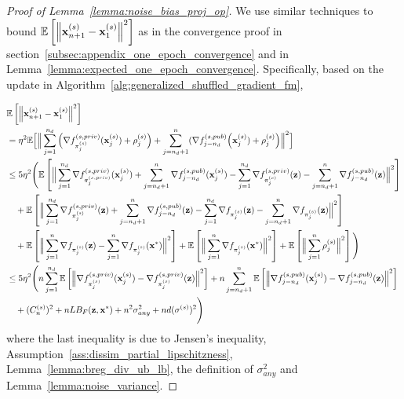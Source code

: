 \begin{proof}[Proof of Lemma~\ref{lemma:noise_bias_proj_op}]
We use similar techniques to bound $\mathbb{E}\left[\left\| {\mathbf{x}}_{n+1}^{(s)} - {\mathbf{x}}_1^{(s)} \right\|^2\right]$ as in the convergence proof in section~\ref{subsec:appendix_one_epoch_convergence} and in Lemma~\ref{lemma:expected_one_epoch_convergence}. Specifically, based on the update in Algorithm~\ref{alg:generalized_shuffled_gradient_fm},

\begin{align}
    &\mathbb{E}\left[ \left\| {\mathbf{x}}_{n+1}^{(s)} - {\mathbf{x}}_1^{(s)}\right\|^2 \right]\\
    \nonumber
    &= \eta^2 \mathbb{E}\Big[\Big\| \sum_{j=1}^{n_d} \Big(\nabla f_{\pi_j^{(s)}}^{(s, priv)}({\mathbf{x}}_j^{(s)}) + \rho_j^{(s)} \Big)
    + \sum_{j=n_d+1}^{n} (\nabla f_{j-n_d}^{(s, pub)}\Big({\mathbf{x}}_{j}^{(s)}) + \rho_j^{(s)} \Big) \Big\|^2
    \Big]\\
    &\leq 5\eta^2 \Bigg(
        \mathbb{E}\left[\Big\|\sum_{j=1}^{n_d} \nabla f_{\pi_j^{(s, priv)}}^{(s, priv)}({\mathbf{x}}_j^{(s)}) + \sum_{j=n_d+1}^{n} \nabla f_{j-n_d}^{(s, pub)}({\mathbf{x}}_j^{(s)})
        - \sum_{j=1}^{n_d}\nabla f_{\pi_j^{(s)}}^{(s,priv)}({\mathbf{z}})
        - \sum_{j=n_d+1}^{n} \nabla f_{j-n_d}^{(s, pub)}({\mathbf{z}})
        \Big\|^2\right]\\
    \nonumber
    &\quad + \mathbb{E}\left[ \Big\| \sum_{j=1}^{n_d}\nabla f_{\pi_j^{(s)}}^{(s,priv)}({\mathbf{z}})
    + \sum_{j=n_d+1}^{n} \nabla f_{j-n_d}^{(s,pub)}({\mathbf{z}})
    - \sum_{j=1}^{n_d} \nabla f_{\pi_j^{(s)}}({\mathbf{z}})
    - \sum_{j=n_d+1}^{n}\nabla f_{\pi_j^{(s)}}({\mathbf{z}})
    \Big\|^2 \right]\\
    \nonumber
    &\quad + \mathbb{E}\left[\Big\| \sum_{j=1}^{n} \nabla f_{\pi_j^{(s)}}({\mathbf{z}}) - \sum_{j=1}^{n} \nabla f_{\pi_j^{(s)}}({\mathbf{x}}^*)
    \Big\|^2\right]
    + \mathbb{E}\left[\Big\| \sum_{j=1}^{n} \nabla f_{\pi_j^{(s)}}({\mathbf{x}}^*) \Big\|^2\right]
    + \mathbb{E}\left[\Big\| \sum_{j=1}^{n} \rho_j^{(s)} \Big\|^2 \right]
    \Bigg)\\
\label{eq:noise_bias_reg_proj_t3}
    &\leq 5\eta^2 \Bigg(
        n\sum_{j=1}^{n_d} \mathbb{E}\left[\Big\| \nabla f_{\pi_j^{(s)}}^{(s,priv)}({\mathbf{x}}_j^{(s)}) - \nabla f_{\pi_j^{(s)}}^{(s,priv)}({\mathbf{z}})\Big\|^2\right]
        + n \sum_{j=n_d+1}^{n} \mathbb{E}\left[\Big\| \nabla f_{j-n_d}^{(s,pub)}({\mathbf{x}}_j^{(s)})
        - \nabla f_{j-n_d}^{(s,pub)}({\mathbf{z}})
        \Big\|^2 \right]\\
    \nonumber
    &\quad + (C_n^{(s)})^2
    + n L B_F({\mathbf{z}}, {\mathbf{x}}^*) + n^2 \sigma_{any}^2 + n d (\sigma^{(s)})^2
    \Bigg)
\end{align}
where the last inequality is due to Jensen's inequality, Assumption~\ref{ass:dissim_partial_lipschitzness}, 
Lemma~\ref{lemma:breg_div_ub_lb}, the definition of $\sigma_{any}^2$ and Lemma~\ref{lemma:noise_variance}.


\end{proof}
